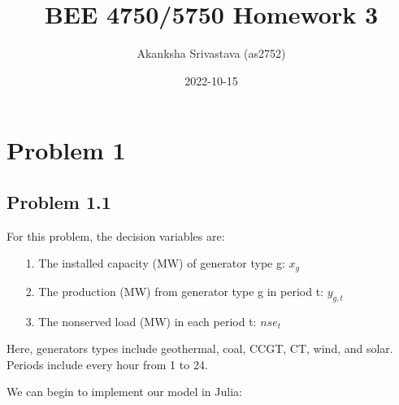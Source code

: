 \documentclass[12pt,a4paper]{article}
\title{ BEE 4750/5750 Homework 3 }
\author{ Akanksha Srivastava (as2752) }
\date{ 2022-10-15 }
\begin{document}
\maketitle





\section{Problem 1}
\subsection{Problem 1.1}
For this problem, the decision variables are: 

\begin{itemize}
\item[1. ] The installed capacity (MW) of generator type g: $x_g$


\item[2. ] The production (MW) from generator type g in period t: $y_{g,t}$


\item[3. ] The nonserved load (MW) in each period t: $nse_t$

\end{itemize}
Here, generators types include geothermal, coal, CCGT, CT, wind, and solar. Periods include every hour from 1 to 24.

We can begin to implement our model in Julia:
\end{document}
